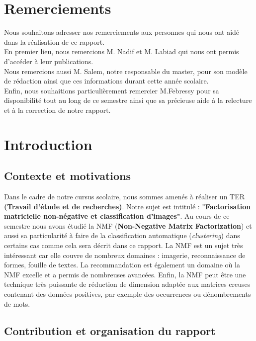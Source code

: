 \documentclass[runningheads]{llncs}
\begin{document}
\section*{Remerciements}
Nous souhaitons adresser nos remerciements aux personnes qui nous ont aidé dans la réalisation de ce rapport. \\
En premier lieu, nous remercions M. Nadif et M. Labiad qui nous ont permis d'accéder à leur publications.\\
Nous remercions aussi M. Salem, notre responsable du master, pour son modèle de rédaction ainsi que ces informations durant cette année scolaire.\\
Enfin, nous souhaitions particulièrement remercier M.Febressy pour sa disponibilité tout au long de ce semestre ainsi que sa précieuse aide à la relecture et à la correction de notre rapport.

\newpage

\section{Introduction}
\subsection{Contexte et motivations}

Dans le cadre de notre cursus scolaire, nous sommes amenés à réaliser un TER \textbf{(Travail d'étude et de recherches)}. Notre sujet est intitulé : \textbf{"Factorisation matricielle non-négative et classification d'images"}. Au cours de ce semestre nous avons étudié la NMF (\textbf{Non-Negative Matrix Factorization}) et aussi sa particularité à faire de la classification automatique (\textit{clustering}) dans certains cas comme cela sera décrit dans ce rapport.
La NMF est un sujet très intéressant car elle couvre de nombreux domaines :  imagerie, reconnaissance de formes, fouille de textes. La recommandation est également un domaine o\`u la NMF excelle et a permis de nombreuses avancées.
Enfin, la NMF peut être une technique très puissante de réduction de dimension adaptée aux matrices creuses contenant des données positives, par exemple des occurrences ou dénombrements de mots.

\subsection{Contribution et organisation du rapport}
\end{document}
